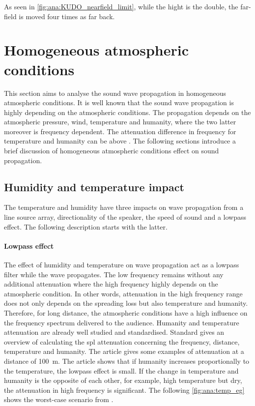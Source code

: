 
As seen in \autoref{fig:ana:KUDO_nearfield_limit}, while the hight is the double, the far-field is moved four times as far back.


\section{Homogeneous atmospheric conditions}\label{sec:ana:hom_ats_con}
This section aims to analyse the sound wave propagation in homogeneous atmospheric conditions. It is well known that the sound wave propagation is highly depending on the atmospheric conditions. The propagation depends on the atmospheric pressure, wind, temperature and humanity, where the two latter moreover is frequency dependent. The attenuation difference in frequency for temperature and humanity can be above  \citep{corteel2017large}. The following sections introduce a brief discussion of homogeneous atmospheric conditions effect on sound propagation.


\subsection{Humidity and temperature impact}\label{sec:ana:hu_temp}
The temperature and humidity have three impacts on wave propagation from a line source array, directionality of the speaker, the speed of sound and a lowpass effect. The following description starts with the latter. 

\paragraph{Lowpass effect} The effect of humidity and temperature on wave propagation act as a lowpass filter while the wave propagates. The low frequency remains without any additional attenuation where the high frequency highly depends on the atmospheric condition. In other words, attenuation in the high frequency range does not only depends on the spreading loss but also temperature and humanity. Therefore, for long distance, the atmospheric conditions have a high influence on the frequency spectrum delivered to the audience. Humanity and temperature attenuation are already well studied and standardised. Standard \citep{iso_9613-1} gives an overview of calculating the \gls{spl}  attenuation concerning the frequency, distance, temperature and humanity. The article \citep{corteel2017large} gives some examples of attenuation at a distance of \SI{100}{\meter}. The article shows that if humanity increases proportionally to the temperature, the lowpass effect is small. If the change in temperature and humanity is the opposite of each other, for example, high temperature but dry, the attenuation in high frequency is significant. The following \autoref{fig:ana:temp_eg} shows the worst-case scenario from \citep{corteel2017large}.

